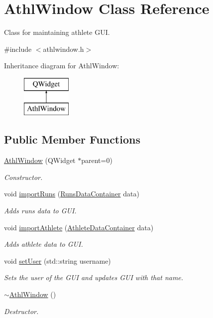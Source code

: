 \hypertarget{classAthlWindow}{}\section{Athl\+Window Class Reference}
\label{classAthlWindow}


Class for maintaining athlete G\+UI.  




{\ttfamily \#include $<$athlwindow.\+h$>$}

Inheritance diagram for Athl\+Window\+:\begin{figure}[H]
\begin{center}
\leavevmode
\includegraphics[height=2.000000cm]{classAthlWindow}
\end{center}
\end{figure}
\subsection*{Public Member Functions}
\begin{DoxyCompactItemize}
\item 
\mbox{\hyperlink{classAthlWindow_a5302bd0bf15527d2381b7847ed15c59b}{Athl\+Window}} (Q\+Widget $\ast$parent=0)
\begin{DoxyCompactList}\small\item\em Constructor. \end{DoxyCompactList}\item 
void \mbox{\hyperlink{classAthlWindow_a827f6b24d61d7edd73b4e34dbb0f4975}{import\+Runs}} (\mbox{\hyperlink{classRunsDataContainer}{Runs\+Data\+Container}} data)
\begin{DoxyCompactList}\small\item\em Adds runs data to G\+UI. \end{DoxyCompactList}\item 
void \mbox{\hyperlink{classAthlWindow_a2764b50cbd347e717eb642bf65b2d559}{import\+Athlete}} (\mbox{\hyperlink{classAthleteDataContainer}{Athlete\+Data\+Container}} data)
\begin{DoxyCompactList}\small\item\em Adds athlete data to G\+UI. \end{DoxyCompactList}\item 
void \mbox{\hyperlink{classAthlWindow_a5a6293ca225dd40912c7099d166956a8}{set\+User}} (std\+::string username)
\begin{DoxyCompactList}\small\item\em Sets the user of the G\+UI and updates G\+UI with that name. \end{DoxyCompactList}\item 
\mbox{\hyperlink{classAthlWindow_a2e01043c83916e0453e20770cf8993ca}{$\sim$\+Athl\+Window}} ()
\begin{DoxyCompactList}\small\item\em Destructor. \end{DoxyCompactList}\end{DoxyCompactItemize}


